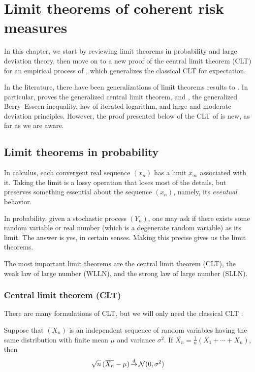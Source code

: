 
\chapter{Limit theorems of coherent risk measures}
\label{chapter_clt}

In this chapter, we start by reviewing limit theorems in probability and large deviation theory, then move on to a new proof of the central limit theorem (CLT) for an empirical process of \cvar, which generalizes the classical CLT for expectation.

In the literature, there have been generalizations of limit theorems results to \cvar. In particular, \cite{chenNonparametricEstimationExpected2007} proves the generalized central limit theorem, and \cite{gaoAsymptoticBehaviorEmpirical2011}, the generalized Berry--Esseen inequality, law of iterated logarithm, and large and moderate deviation principles.  However, the proof presented below of the CLT of \cvar is new, as far as we are aware.

\section{Limit theorems in probability}
In calculus, each convergent real sequence $(x_n)$ has a limit $x_\infty$ associated with it. Taking the limit is a lossy operation that loses most of the details, but preserves something essential about the sequence $(x_n)$, namely, its \textit{eventual} behavior.

In probability, given a stochastic process $(Y_n)$, one may ask if there exists some random variable or real number (which is a degenerate random variable) as its limit. The answer is yes, in certain senses. Making this precise gives us the limit theorems.


The most important limit theorems are the central limit theorem (CLT), the weak law of large number (WLLN), and the strong law of large number (SLLN).

\subsection{Central limit theorem (CLT)}
There are many formulations of CLT, but we will only need the classical CLT \cite[Theorem 27.1]{billingsleyProbabilityMeasure2012}:
\begin{theorem}
Suppose that $(X_n)$ is an independent sequence of random variables having the
same distribution with finite mean $\mu$ and variance $\sigma^2$. If $\overbar{X_n} = \frac 1 n (X_1 + \cdots +X_n)$, then 
\begin{equation}
\label{eq:clt}
\sqrt{n}\, (\overbar{X_n} - \mu)
\distconv \mathcal{N}(0, \sigma^2)
\end{equation}
\end{theorem}

